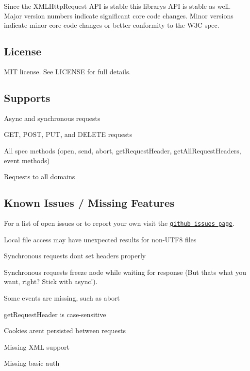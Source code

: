 Since the X\+M\+L\+Http\+Request A\+PI is stable this library\textquotesingle{}s A\+PI is stable as well. Major version numbers indicate significant core code changes. Minor versions indicate minor core code changes or better conformity to the W3C spec.

\subsection*{License}

M\+IT license. See L\+I\+C\+E\+N\+SE for full details.

\subsection*{Supports}


\begin{DoxyItemize}
\item Async and synchronous requests
\item G\+ET, P\+O\+ST, P\+UT, and D\+E\+L\+E\+TE requests
\item All spec methods (open, send, abort, get\+Request\+Header, get\+All\+Request\+Headers, event methods)
\item Requests to all domains
\end{DoxyItemize}

\subsection*{Known Issues / Missing Features}

For a list of open issues or to report your own visit the \href{https://github.com/driverdan/node-XMLHttpRequest/issues}{\tt github issues page}.


\begin{DoxyItemize}
\item Local file access may have unexpected results for non-\/\+U\+T\+F8 files
\item Synchronous requests don\textquotesingle{}t set headers properly
\item Synchronous requests freeze node while waiting for response (But that\textquotesingle{}s what you want, right? Stick with async!).
\item Some events are missing, such as abort
\item get\+Request\+Header is case-\/sensitive
\item Cookies aren\textquotesingle{}t persisted between requests
\item Missing X\+ML support
\item Missing basic auth 
\end{DoxyItemize}